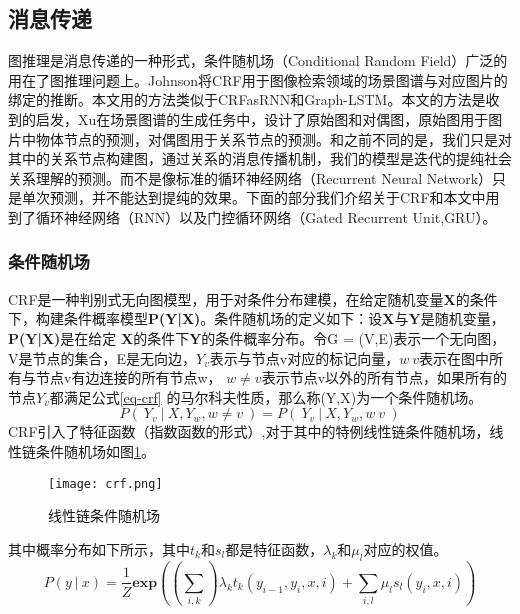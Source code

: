 
\subsection{消息传递}

图推理是消息传递的一种形式，条件随机场（Conditional Random Field）广泛的用在了图推理问题上。Johnson\cite{johnson2015image}将CRF用于图像检索领域的场景图谱与对应图片的绑定的推断。本文用的方法类似于CRFasRNN\cite{zheng2015conditional}和Graph-LSTM\cite{liang2016semantic}。本文的方法是收到\cite{xu2017scene}的启发，Xu在场景图谱的生成任务中，设计了原始图和对偶图，原始图用于图片中物体节点的预测，对偶图用于关系节点的预测。和之前不同的是，我们只是对其中的关系节点构建图，通过关系的消息传播机制，我们的模型是迭代的提纯社会关系理解的预测。而不是像标准的循环神经网络（Recurrent Neural Network）只是单次预测，并不能达到提纯的效果。下面的部分我们介绍关于CRF和本文中用到了循环神经网络（RNN）以及门控循环网络（Gated Recurrent Unit,GRU）。

\subsubsection{条件随机场}
CRF是一种判别式无向图模型，用于对条件分布建模，在给定随机变量\textbf{X}的条件下，构建条件概率模型\textbf{P(Y|X)}。条件随机场的定义如下：设\textbf{X}与\textbf{Y}是随机变量，\textbf{P(Y|X)}是在给定
\textbf{X}的条件下\textbf{Y}的条件概率分布。令G = (V,E)表示一个无向图，V是节点的集合，E是无向边，$Y_{v}$表示与节点v对应的标记向量，$w~v$表示在图中所有与节点v有边连接的所有节点w，
$w \neq v$表示节点v以外的所有节点，如果所有的节点$Y_v$都满足公式\ref{eq-crf}  的马尔科夫性质，那么称(Y,X)为一个条件随机场。
\begin{equation} \label{eq-crf}
    P(~Y_{v}~|~X,Y_w,w \neq v~) = P(~Y_v~|~X,Y_w,w~v~)
\end{equation}
CRF引入了特征函数（指数函数的形式）,对于其中的特例线性链条件随机场，线性链条件随机场如图\ref{fig:crf}。
\begin{figure}[htpb]
	\centering
	\texttt{[image: crf.png]}
    \caption{线性链条件随机场}
	\vspace*{-3.5mm}
	\label{fig:crf}
\end{figure}
其中概率分布如下所示，其中$t_{k}$和$s_{l}$都是特征函数，$\lambda_{k}$和$\mu_{l}$对应的权值。
\begin{equation}
    P(y~|~x) = \frac{1}{Z}\mathbf{exp}((\sum_{i,k})\lambda_{k}t_{k}(y_{i-1},y_{i},x,i)+\sum_{i,l}\mu_{l}s_{l}(y_{i},x,i))
\end{equation}

